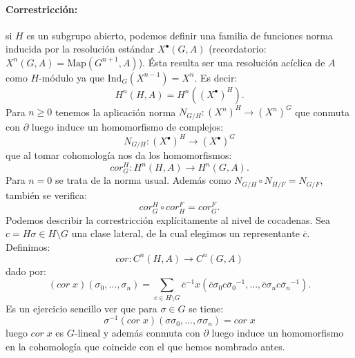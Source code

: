\documentclass[a4paper,12pt, leqno]{article}
\begin{document}
	\paragraph{Correstricción:} si $H$ es un subgrupo abierto, podemos definir una familia de funciones norma inducida por la resolución estándar $X^{\bullet}(G,A)$ (recordatorio: $X^n(G,A)=\mathrm{Map}(G^{n+1},A)$). Ésta resulta ser una resolución acíclica de $A$ como $H$-módulo ya que $\mathrm{Ind}_G(X^{n-1})=X^n$. Es decir:
	\begin{equation*}
	H^n(H,A)=H^n((X^{\bullet})^H).
	\end{equation*}
	Para $n\geq 0$ tenemos la aplicación norma $N_{G/H}:(X^n)^H \rightarrow (X^n)^G$ que conmuta con $\partial$ luego induce un homomorfismo de complejos:
	\begin{equation*}
	N_{G/H}: (X^{\bullet})^H \rightarrow (X^{\bullet})^G
	\end{equation*}
	que al tomar cohomología nos da los homomorfismos:
	\begin{equation*}
	cor_G^H: H^n(H,A) \rightarrow H^n(G,A).
	\end{equation*}
	Para $n=0$ se trata de la norma usual. Además como $N_{G/H}\circ N_{H/F} = N_{G/F}$, también se verifica:
	\begin{equation*}
	cor_G^H \circ cor_H ^F = cor_G ^F.
	\end{equation*}
	Podemos describir la correstricción explícitamente al nivel de cocadenas. Sea $c= H \sigma \in H\setminus G$ una clase lateral, de la cual elegimos un representante $\overline{c}$. Definimos:
	\begin{equation*}
	cor: C^n(H,A) \rightarrow C^n(G,A)
	\end{equation*}
	dado por:
	\begin{equation*}
	(cor\; x)(\sigma_0,...,\sigma_n)=\sum\limits_{c \in H\setminus G} \overline{c}^{-1} x(\overline{c}\sigma_0 \overline{c \sigma_0}^{-1},..., \overline{c}\sigma_n \overline{c \sigma_n}^{-1}).
	\end{equation*}
	Es un ejercicio sencillo ver que para $\sigma \in G$ se tiene:
	\begin{equation*}
	\sigma^{-1}(cor \;x)(\sigma \sigma_0,...,\sigma \sigma_n)=cor\;x
	\end{equation*}
	luego $cor\;x$ es $G$-lineal y además conmuta con $\partial$ luego induce un homomorfismo en la cohomología que coincide con el que hemos nombrado antes. 
\end{document}

